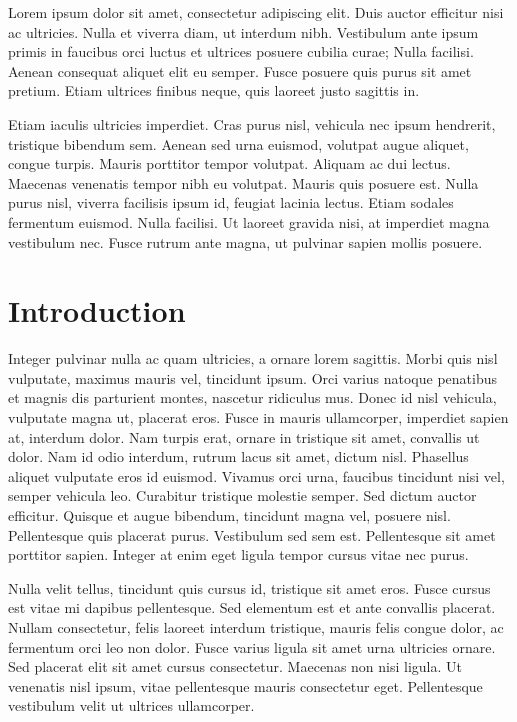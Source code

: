 \documentclass[
]{article}
\begin{document}
Lorem ipsum dolor sit amet, consectetur adipiscing elit. Duis auctor
efficitur nisi ac ultricies. Nulla et viverra diam, ut interdum nibh.
Vestibulum ante ipsum primis in faucibus orci luctus et ultrices posuere
cubilia curae; Nulla facilisi. Aenean consequat aliquet elit eu semper.
Fusce posuere quis purus sit amet pretium. Etiam ultrices finibus neque,
quis laoreet justo sagittis in.

Etiam iaculis ultricies imperdiet. Cras purus nisl, vehicula nec ipsum
hendrerit, tristique bibendum sem. Aenean sed urna euismod, volutpat
augue aliquet, congue turpis. Mauris porttitor tempor volutpat. Aliquam
ac dui lectus. Maecenas venenatis tempor nibh eu volutpat. Mauris quis
posuere est. Nulla purus nisl, viverra facilisis ipsum id, feugiat
lacinia lectus. Etiam sodales fermentum euismod. Nulla facilisi. Ut
laoreet gravida nisi, at imperdiet magna vestibulum nec. Fusce rutrum
ante magna, ut pulvinar sapien mollis posuere.

\newpage

\hypertarget{introduction}{%
\section{Introduction}\label{introduction}}

Integer pulvinar nulla ac quam ultricies, a ornare lorem sagittis. Morbi
quis nisl vulputate, maximus mauris vel, tincidunt ipsum. Orci varius
natoque penatibus et magnis dis parturient montes, nascetur ridiculus
mus. Donec id nisl vehicula, vulputate magna ut, placerat eros. Fusce in
mauris ullamcorper, imperdiet sapien at, interdum dolor. Nam turpis
erat, ornare in tristique sit amet, convallis ut dolor. Nam id odio
interdum, rutrum lacus sit amet, dictum nisl. Phasellus aliquet
vulputate eros id euismod. Vivamus orci urna, faucibus tincidunt nisi
vel, semper vehicula leo. Curabitur tristique molestie semper. Sed
dictum auctor efficitur. Quisque et augue bibendum, tincidunt magna vel,
posuere nisl. Pellentesque quis placerat purus. Vestibulum sed sem est.
Pellentesque sit amet porttitor sapien. Integer at enim eget ligula
tempor cursus vitae nec purus.

Nulla velit tellus, tincidunt quis cursus id, tristique sit amet eros.
Fusce cursus est vitae mi dapibus pellentesque. Sed elementum est et
ante convallis placerat. Nullam consectetur, felis laoreet interdum
tristique, mauris felis congue dolor, ac fermentum orci leo non dolor.
Fusce varius ligula sit amet urna ultricies ornare. Sed placerat elit
sit amet cursus consectetur. Maecenas non nisi ligula. Ut venenatis nisl
ipsum, vitae pellentesque mauris consectetur eget. Pellentesque
vestibulum velit ut ultrices ullamcorper.
\end{document}
